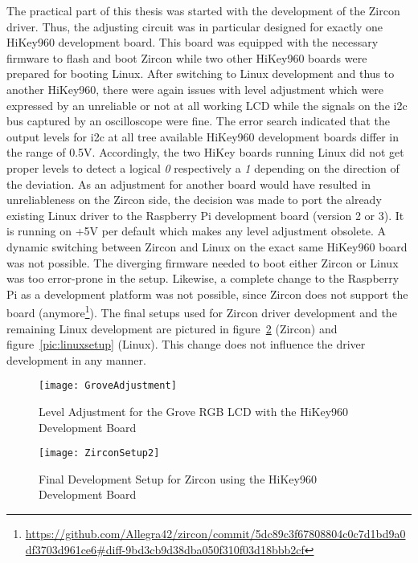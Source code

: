 The practical part of this thesis was started with the development of the Zircon driver.
Thus, the adjusting circuit was in particular designed for exactly one HiKey960 development board.
This board was equipped with the necessary firmware to flash and boot Zircon while two other HiKey960 boards were prepared for booting Linux.
After switching to Linux development and thus to another HiKey960, there were again issues with level adjustment which were expressed by an unreliable or not at all working LCD while the signals on the \ac{i2c} bus captured by an oscilloscope were fine.
The error search indicated that the output levels for \ac{i2c} at all tree available HiKey960 development boards differ in the range of 0.5V.
Accordingly, the two HiKey boards running Linux did not get proper levels to detect a logical \textit{0} respectively a \textit{1} depending on the direction of the deviation.
As an adjustment for another board would have resulted in unreliableness on the Zircon side, the decision was made to port the already existing Linux driver to the Raspberry Pi development board (version 2 or 3).
It is running on +5V per default which makes any level adjustment obsolete. 
A dynamic switching between Zircon and Linux on the exact same HiKey960 board was not possible.
The diverging firmware needed to boot either Zircon or Linux was too error-prone in the setup.
Likewise, a complete change to the Raspberry Pi as a development platform was not possible, since Zircon does not support the board (anymore\footnote{\url{https://github.com/Allegra42/zircon/commit/5dc89c3f67808804c0c7d1bd9a0df3703d961ce6#diff-9bd3cb9d38dba050f310f03d18bbb2cf}}).
The final setups used for Zircon driver development and the remaining Linux development are pictured in figure~\ref{pic:zirconsetup} (Zircon) and figure~\ref{pic:linuxsetup} (Linux).
This change does not influence the driver development in any manner.

\begin{figure} [t]
    \centering
    \texttt{[image: GroveAdjustment]}
    \caption{Level Adjustment for the Grove RGB LCD with the HiKey960 Development Board}\label{pic:groveadjust}
\end{figure} 

\begin{figure} [H]
    \centering
    \texttt{[image: ZirconSetup2]}
    \caption{Final Development Setup for Zircon using the HiKey960 Development Board}\label{pic:zirconsetup}
\end{figure} 

